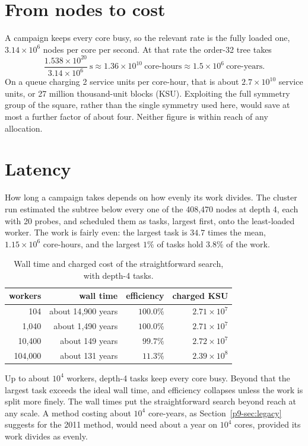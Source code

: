 \documentclass[11pt,a4paper,oneside]{report}
\theoremstyle{definition}
\begin{document}
\section{From nodes to cost}
\label{p9-sec:cost}
A campaign keeps every core busy, so the relevant rate is the fully loaded one, $3.14\times10^6$ nodes per
core per second. At that rate the order-32 tree takes
\[
\frac{1.538\times10^{20}}{3.14\times10^6}\ \text{s}\approx1.36\times10^{10}\ \text{core-hours}
\approx1.5\times10^{6}\ \text{core-years}.
\]
On a queue charging 2 service units per core-hour, that is about $2.7\times10^{10}$ service units, or
27 million thousand-unit blocks (KSU). Exploiting the full symmetry group of the square, rather than the
single symmetry used here, would save at most a further factor of about four. Neither figure is within
reach of any allocation.

\section{Latency}
\label{p9-sec:latency}
How long a campaign takes depends on how evenly its work divides. The cluster run estimated the subtree
below every one of the 408{,}470 nodes at depth 4, each with 20 probes, and scheduled them as tasks,
largest first, onto the least-loaded worker. The work is fairly even: the largest task is $34.7$ times
the mean, $1.15\times10^6$ core-hours, and the largest $1\%$ of tasks hold $3.8\%$ of the work.

\begin{table}[H]
\centering
\small
\begin{tabular}{@{}rrrr@{}}
\toprule
workers & wall time & efficiency & charged KSU \\
\midrule
104 & about 14{,}900 years & $100.0\%$ & $2.71\times10^7$ \\
1{,}040 & about 1{,}490 years & $100.0\%$ & $2.71\times10^7$ \\
10{,}400 & about 149 years & $99.7\%$ & $2.72\times10^7$ \\
104{,}000 & about 131 years & $11.3\%$ & $2.39\times10^8$ \\
\bottomrule
\end{tabular}
\caption{Wall time and charged cost of the straightforward search, with depth-4 tasks.}
\label{p9-tab:latency}
\end{table}

\noindent Up to about $10^4$ workers, depth-4 tasks keep every core busy. Beyond that the largest task
exceeds the ideal wall time, and efficiency collapses unless the work is split more finely. The wall
times put the straightforward search beyond reach at any scale. A method costing about $10^4$ core-years,
as Section~\ref{p9-sec:legacy} suggests for the 2011 method, would need about a year on $10^4$ cores,
provided its work divides as evenly.
\end{document}
